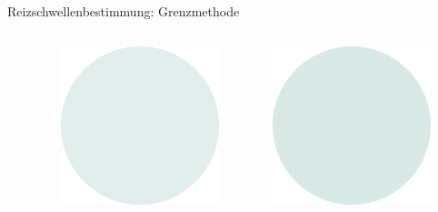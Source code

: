 \documentclass[aspectratio=169]{beamer}
\begin{document}
\begin{frame}{Reizschwellenbestimmung: Grenzmethode}
\begin{columns}[c]
\begin{column}{1cm}
\end{column}
\begin{column}{1cm}
\includegraphics[width=\textwidth]{reizschwelle_seriell_5.png}
\end{column}
\begin{column}{1cm}
\includegraphics[width=\textwidth]{reizschwelle_seriell_6.png}

\end{column}
\end{columns}
\end{frame}
\end{document}

